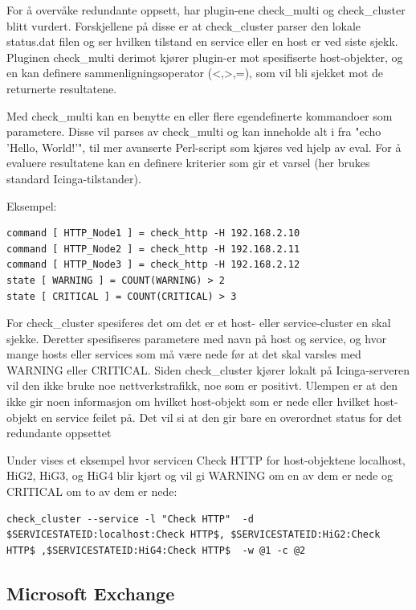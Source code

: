 For å overvåke redundante oppsett, har plugin-ene check\_multi \cite{checkmulti} og check\_cluster \cite{checkcluster} blitt vurdert. Forskjellene på disse er at check\_cluster parser den lokale status.dat filen og ser hvilken tilstand en service eller en host er ved siste sjekk. Pluginen check\_multi derimot kjører plugin-er mot spesifiserte host-objekter, og en kan definere sammenligningsoperator (<,>,=), som vil bli sjekket mot de returnerte resultatene.

Med check\_multi kan en benytte en eller flere egendefinerte kommandoer som parametere. Disse vil parses av check\_multi og kan inneholde alt i fra "echo 'Hello, World!'", til mer avanserte Perl-script som kjøres ved hjelp av eval. For å evaluere resultatene kan en definere kriterier som gir et varsel (her brukes standard Icinga-tilstander). 

Eksempel:
\begin{lstlisting}[style=example]
command [ HTTP_Node1 ] = check_http -H 192.168.2.10
command [ HTTP_Node2 ] = check_http -H 192.168.2.11
command [ HTTP_Node3 ] = check_http -H 192.168.2.12
state [ WARNING ] = COUNT(WARNING) > 2
state [ CRITICAL ] = COUNT(CRITICAL) > 3
\end{lstlisting}
For check\_cluster spesiferes det om det er et host- eller service-cluster en skal sjekke. Deretter spesifiseres parametere med navn på host og service, og hvor mange hosts eller services som må være nede før at det skal varsles med WARNING eller CRITICAL. Siden check\_cluster kjører lokalt på Icinga-serveren vil den ikke bruke noe nettverkstrafikk, noe som er positivt. Ulempen er at den ikke gir noen informasjon om hvilket host-objekt som er nede eller hvilket host-objekt en service feilet på. Det vil si at den gir bare en overordnet status for det redundante oppsettet     

Under vises et eksempel hvor servicen Check HTTP for host-objektene localhost, HiG2, HiG3, og HiG4 blir kjørt og vil gi WARNING om en av dem er nede og CRITICAL om to av dem er nede: 
\begin{lstlisting}[style=example]
check_cluster --service -l "Check HTTP"  -d $SERVICESTATEID:localhost:Check HTTP$, $SERVICESTATEID:HiG2:Check HTTP$ ,$SERVICESTATEID:HiG4:Check HTTP$  -w @1 -c @2
\end{lstlisting}

\subsection{Microsoft Exchange}

